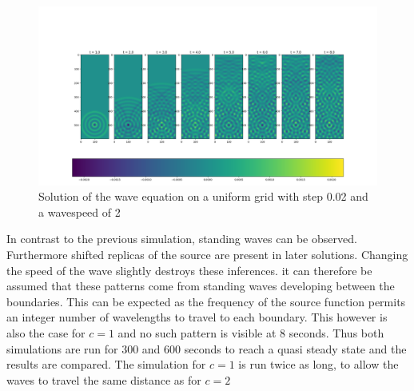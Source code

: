 \documentclass{article}
\begin{document}
\begin{figure}[H]
	\centering
	\includegraphics[width=.9\linewidth]{31.png}
	\caption{Solution of the wave equation on a uniform grid with step 0.02 and a wavespeed of 2}
\end{figure}
In contrast to the previous simulation, standing waves can be observed. Furthermore shifted replicas of the source are present in later solutions. Changing the speed of the wave slightly destroys these inferences. it can therefore be assumed that these patterns come from standing waves developing between the boundaries. This can be expected as the frequency of the source function permits an integer number of wavelengths to travel to each boundary. This however is also the case for $c=1$ and no such pattern is visible at 8 seconds. Thus both simulations are run for 300 and 600 seconds to reach a quasi steady state and the results are compared. The simulation for $c=1$ is run twice as long, to allow the waves to travel the same distance as for $c=2$
    
\end{document}
